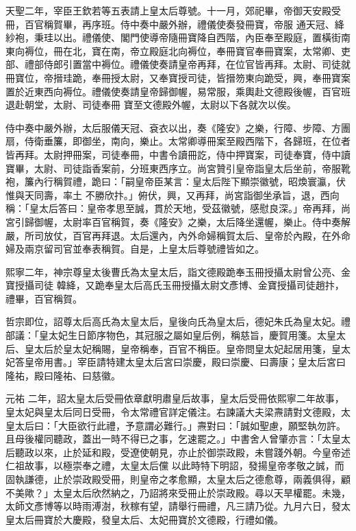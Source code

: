 \begin{pinyinscope}
 天聖二年，宰臣王欽若等五表請上皇太后尊號。十一月，郊祀畢，帝御天安殿受冊，百官稱賀畢，再序班。侍中奏中嚴外辦，禮儀使奏發冊寶，帝服
 通天冠、絳紗袍，秉珪以出。禮儀使、閣門使導帝隨冊寶降自西階，內臣奉至殿庭，置橫街南東向褥位，冊在北，寶在南，帝立殿庭北向褥位，奉冊寶官奉冊寶案，太常卿、吏部、禮部侍郎引置當中褥位。禮儀使奏請皇帝再拜，在位官皆再拜。太尉、司徒就冊寶位，帝搢珪跪，奉冊授太尉，又奉寶授司徒，皆搢笏東向跪受，興，奉冊寶案置於近東西向褥位。禮儀使奏請皇帝歸御幄，易常服，乘輿赴文德殿後幄，百官班退赴朝堂，太尉、司徒奉冊
 寶至文德殿外幄，太尉以下各就次以俟。



 侍中奏中嚴外辦，太后服儀天冠、袞衣以出，奏《隆安》之樂，行障、步障、方團扇，侍衛垂簾，即御坐，南向，樂止。太常卿導冊案至殿西階下，各歸班，在位者皆再拜。太尉押冊案，司徒奉冊，中書令讀冊訖，侍中押寶案，司徒奉寶，侍中讀寶畢，太尉、司徒詣香案前，分班東西序立。尚宮贊引皇帝詣皇太后坐前，帝服靴袍，簾內行稱賀禮，跪曰：「嗣皇帝臣某言：皇太后陛下顯崇徽號，昭煥寰瀛，伏惟與天同壽，率土
 不勝欣抃。」俯伏，興，又再拜，尚宮詣御坐承旨，退，西向稱：「皇太后答曰：皇帝孝思至誠，貫於天地，受茲徽號，感慰良深。」帝再拜，尚宮引歸御幄，太尉率百官稱賀，奏《隆安》之樂，太后降坐還幄，樂止。侍中奏解嚴，所司放仗，百官再拜退。太后還內，內外命婦稱賀太后、皇帝於內殿，在外命婦及兩京留司官並奉表稱賀。自是，上皇太后尊號禮皆如之。



 熙寧二年，神宗尊皇太後曹氏為太皇太后，詣文德殿跪奉玉冊授攝太尉曾公亮、金寶授攝司徒
 韓絳，又跪奉皇太后高氏玉冊授攝太尉文彥博、金寶授攝司徒趙抃，禮畢，百官稱賀。



 哲宗即位，詔尊太后高氏為太皇太后，皇後向氏為皇太后，德妃朱氏為皇太妃。禮部議：「皇太妃生日節序物色，其冠服之屬如皇后例，稱慈旨，慶賀用箋。太皇太后、皇太后於皇太妃稱賜，皇帝稱奉，百官不稱臣。皇帝問皇太妃起居用箋，皇太妃答皇帝用書。」宰臣請特建太皇太后宮曰崇慶，殿曰崇慶、曰壽康；皇太后宮曰隆祐，殿曰隆祐、曰慈徽。



 元祐
 二年，詔太皇太后受冊依章獻明肅皇后故事，皇太后受冊依熙寧二年故事，皇太妃與皇太后同日受冊，令太常禮官詳定儀注。右諫議大夫梁燾請對文德殿，太皇太后曰：「大臣欲行此禮，予意謂必難行。」燾對曰：「誠如聖慮，願堅執勿許。且母後權同聽政，蓋出一時不得已之事，乞速罷之。」中書舍人曾肇亦言：「太皇太后聽政以來，止於延和殿，受遼使朝見，亦止於御崇政殿，未嘗踐外朝。今皇帝述仁祖故事，以極崇奉之禮，太皇太后儻
 以此時特下明詔，發揚皇帝孝敬之誠，而固執謙德，止於崇政殿受冊，則皇帝之孝愈顯，太皇太后之德愈尊，兩義俱得，顧不美歟？」太皇太后欣然納之，乃詔將來受冊止於崇政殿。尋以天旱權罷。未幾，太師文彥博等以時雨溥澍，秋稼有望，請舉行冊禮，凡三請乃從。九月六日，發太皇太后冊寶於大慶殿，發皇太后、太妃冊寶於文德殿，行禮如儀。




\end{pinyinscope}
